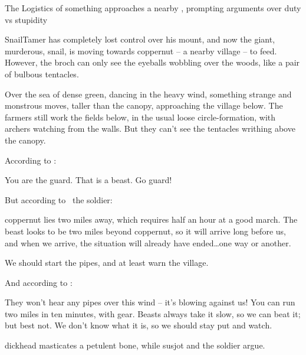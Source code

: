 
{The Logistics of }%
{something approaches a nearby , prompting arguments over duty vs stupidity}%

\Gls{SnailTamer} has completely lost control over his mount, and now the giant, murderous, snail, is moving towards \gls{coppernut} -- a nearby \gls{village} -- to feed.
However, the \gls{broch} can only see the eyeballs wobbling over the woods, like a pair of bulbous tentacles.

\begin{boxtext}
  Over the sea of dense green, dancing in the heavy wind, something strange and monstrous moves, taller than the canopy, approaching the \gls{village} below.
  The farmers still work the fields below, in the usual loose circle-formation, with archers watching from the walls.
  But they can't see the tentacles writhing above the canopy.
\end{boxtext}

According to :

\begin{speechtext}
  You are the \gls{guard}.
  That is a beast.
  Go guard!
\end{speechtext}

But according to \composeHumanName\ the \gls{soldier}:

\begin{speechtext}
  \Gls{coppernut} lies two miles away, which requires half an hour at a good march.
  The beast looks to be two miles beyond \gls{coppernut}, so it will arrive long before us, and when we arrive, the situation will already have ended\ldots one way or another.

  We should start the pipes, and at least warn the \gls{village}.
\end{speechtext}

And according to :

\begin{speechtext}
  They won't hear any pipes over this wind -- it's blowing against us!
  You can run two miles in ten minutes, with gear.
  Beasts always take it slow, so we can beat it; but best not.
  We don't know what it is, so we should stay put and watch.
\end{speechtext}

\begin{boxtext}
  \Gls{dickhead} masticates a petulent bone, while \gls{susjot} and the \gls{soldier} argue.
\end{boxtext}


